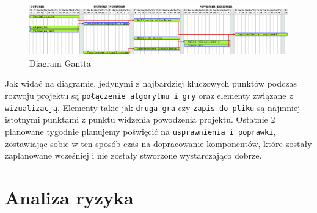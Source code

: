 \documentclass{article}
\let\oldsection\section
\renewcommand\section{\clearpage\oldsection}
\begin{document}
	\begin{figure}[h]
		\centering
		\includegraphics[width=\textwidth]{gantt}
		\caption{Diagram Gantta}
		\label{rys:gantt}
	\end{figure}

	\noindent Jak widać na diagramie, jedynymi z najbardziej kluczowych punktów podczas rozwoju projektu są \texttt{połączenie algorytmu i gry} oraz elementy związane z \texttt{wizualizacją}. Elementy takie jak \texttt{druga gra} czy \texttt{zapis do pliku} są najmniej istotnymi punktami z punktu widzenia powodzenia projektu. Ostatnie 2 planowane tygodnie planujemy poświęcić na \texttt{usprawnienia i poprawki}, zostawiając sobie w ten sposób czas na dopracowanie komponentów, które zostały zaplanowane wcześniej i nie zostały stworzone wystarczająco dobrze.
		
	
	\section{Analiza ryzyka}
	
\end{document}
